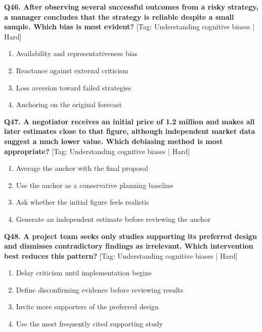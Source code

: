 \noindent\textbf{Q46. After observing several successful outcomes from a risky strategy, a manager concludes that the strategy is reliable despite a small sample. Which bias is most evident?} \hfill [Tag: Understanding cognitive biases | Hard]
\begin{enumerate}[label=(\alph*),topsep=2pt,itemsep=1pt,partopsep=0pt,parsep=0pt]
    \item {Availability and representativeness bias}
    \item {Reactance against external criticism}
    \item {Loss aversion toward failed strategies}
    \item {Anchoring on the original forecast}
\end{enumerate}
\vspace{2mm}

\noindent\textbf{Q47. A negotiator receives an initial price of 1.2 million and makes all later estimates close to that figure, although independent market data suggest a much lower value. Which debiasing method is most appropriate?} \hfill [Tag: Understanding cognitive biases | Hard]
\begin{enumerate}[label=(\alph*),topsep=2pt,itemsep=1pt,partopsep=0pt,parsep=0pt]
    \item {Average the anchor with the final proposal}
    \item {Use the anchor as a conservative planning baseline}
    \item {Ask whether the initial figure feels realistic}
    \item {Generate an independent estimate before reviewing the anchor}
\end{enumerate}
\vspace{2mm}

\noindent\textbf{Q48. A project team seeks only studies supporting its preferred design and dismisses contradictory findings as irrelevant. Which intervention best reduces this pattern?} \hfill [Tag: Understanding cognitive biases | Hard]
\begin{enumerate}[label=(\alph*),topsep=2pt,itemsep=1pt,partopsep=0pt,parsep=0pt]
    \item {Delay criticism until implementation begins}
    \item {Define disconfirming evidence before reviewing results}
    \item {Invite more supporters of the preferred design}
    \item {Use the most frequently cited supporting study}
\end{enumerate}
\vspace{2mm}


